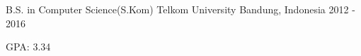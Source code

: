 \begin{cventries}

\cventry
    {B.S. in Computer Science(S.Kom)}
    {Telkom University}
    {Bandung, Indonesia}
    {2012 - 2016}
    {
        \begin{cvitems}
            \item {GPA: 3.34}
        \end{cvitems}
    }
    
\end{cventries}
